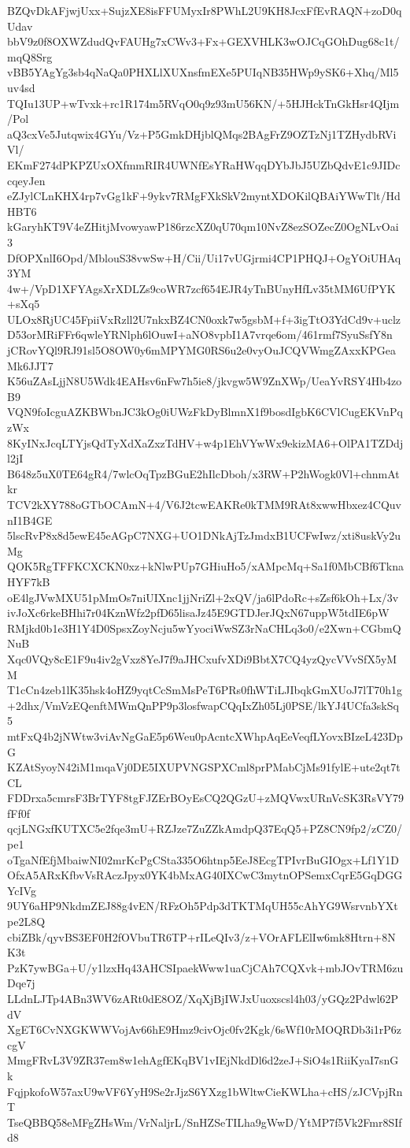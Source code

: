 BZQvDkAFjwjUxx+SujzXE8isFFUMyxIr8PWhL2U9KH8JcxFfEvRAQN+zoD0qUdav
bbV9z0f8OXWZdudQvFAUHg7xCWv3+Fx+GEXVHLK3wOJCqGOhDug68c1t/mqQ8Srg
vBB5YAgYg3sb4qNaQa0PHXLlXUXnsfmEXe5PUIqNB35HWp9ySK6+Xhq/Ml5uv4sd
TQIu13UP+wTvxk+rc1R174m5RVqO0q9z93mU56KN/+5HJHckTnGkHsr4QIjm/Pol
aQ3cxVe5Jutqwix4GYu/Vz+P5GmkDHjblQMqs2BAgFrZ9OZTzNj1TZHydbRViVl/
EKmF274dPKPZUxOXfmmRIR4UWNfEsYRaHWqqDYbJbJ5UZbQdvE1c9JIDccqeyJen
eZJylCLnKHX4rp7vGg1kF+9ykv7RMgFXkSkV2myntXDOKilQBAiYWwTlt/HdHBT6
kGaryhKT9V4eZHitjMvowyawP186rzcXZ0qU70qm10NvZ8ezSOZecZ0OgNLvOai3
DfOPXnlI6Opd/MblouS38vwSw+H/Cii/Ui17vUGjrmi4CP1PHQJ+OgYOiUHAq3YM
4w+/VpD1XFYAgsXrXDLZs9coWR7zcf654EJR4yTnBUnyHfLv35tMM6UfPYK+sXq5
ULOx8RjUC45FpiiVxRzll2U7nkxBZ4CN0oxk7w5gsbM+f+3igTtO3YdCd9v+uclz
D53orMRiFFr6qwleYRNlph6lOuwI+aNO8vpbI1A7vrqe6om/461rmf7SyuSsfY8n
jCRovYQl9RJ91sl5O8OW0y6mMPYMG0RS6u2e0vyOuJCQVWmgZAxxKPGeaMk6JJT7
K56uZAsLjjN8U5Wdk4EAHsv6nFw7h5ie8/jkvgw5W9ZnXWp/UeaYvRSY4Hb4zoB9
VQN9foIcguAZKBWbnJC3kOg0iUWzFkDyBlmnX1f9bosdIgbK6CVlCugEKVnPqzWx
8KyINxJcqLTYjsQdTyXdXaZxzTdHV+w4p1EhVYwWx9ekizMA6+OlPA1TZDdjl2jI
B648z5uX0TE64gR4/7wlcOqTpzBGuE2hIlcDboh/x3RW+P2hWogk0Vl+chnmAtkr
TCV2kXY788oGTbOCAmN+4/V6J2tcwEAKRe0kTMM9RAt8xwwHbxez4CQuvnI1B4GE
5lscRvP8x8d5ewE45eAGpC7NXG+UO1DNkAjTzJmdxB1UCFwIwz/xti8uskVy2uMg
QOK5RgTFFKCXCKN0xz+kNlwPUp7GHiuHo5/xAMpcMq+Sa1f0MbCBf6TknaHYF7kB
oE4lgJVwMXU51pMmOs7niUIXnc1jjNriZl+2xQV/ja6lPdoRc+sZsf6kOh+Lx/3v
ivJoXc6rkeBHhi7r04KznWfz2pfD65lisaJz45E9GTDJerJQxN67uppW5tdIE6pW
RMjkd0b1e3H1Y4D0SpsxZoyNcju5wYyociWwSZ3rNaCHLq3o0/e2Xwn+CGbmQNuB
Xqc0VQy8cE1F9u4iv2gVxz8YeJ7f9aJHCxufvXDi9BbtX7CQ4yzQycVVvSfX5yMM
T1cCn4zeb1lK35hsk4oHZ9yqtCcSmMsPeT6PRs0fhWTiLJIbqkGmXUoJ7lT70h1g
+2dhx/VmVzEQenftMWmQnPP9p3losfwapCQqIxZh05Lj0PSE/lkYJ4UCfa3skSq5
mtFxQ4b2jNWtw3viAvNgGaE5p6Weu0pAcntcXWhpAqEeVeqfLYovxBIzeL423DpG
KZAtSyoyN42iM1mqaVj0DE5IXUPVNGSPXCml8prPMabCjMs91fylE+ute2qt7tCL
FDDrxa5cmrsF3BrTYF8tgFJZErBOyEsCQ2QGzU+zMQVwxURnVcSK3RsVY79fFf0f
qcjLNGxfKUTXC5e2fqe3mU+RZJze7ZuZZkAmdpQ37EqQ5+PZ8CN9fp2/zCZ0/pe1
oTgaNfEfjMbaiwNI02mrKcPgCSta335O6htnp5EeJ8EcgTPIvrBuGIOgx+Lf1Y1D
OfxA5ARxKfbvVsRAczJpyx0YK4bMxAG40IXCwC3mytnOPSemxCqrE5GqDGGYcIVg
9UY6aHP9NkdmZEJ88g4vEN/RFzOh5Pdp3dTKTMqUH55cAhYG9WsrvnbYXtpe2L8Q
cbiZBk/qyvBS3EF0H2fOVbuTR6TP+rILeQIv3/z+VOrAFLElIw6mk8Htrn+8NK3t
PzK7ywBGa+U/y1lzxHq43AHCSIpaekWww1uaCjCAh7CQXvk+mbJOvTRM6zuDqe7j
LLdnLJTp4ABn3WV6zARt0dE8OZ/XqXjBjIWJxUuoxscsl4h03/yGQz2Pdwl62PdV
XgET6CvNXGKWWVojAv66hE9Hmz9civOjc0fv2Kgk/6sWf10rMOQRDb3i1rP6zcgV
MmgFRvL3V9ZR37em8w1ehAgfEKqBV1vIEjNkdDl6d2zeJ+SiO4s1RiiKyaI7snGk
FqjpkofoW57axU9wVF6YyH9Se2rJjzS6YXzg1bWltwCieKWLha+cHS/zJCVpjRnT
TseQBBQ58eMFgZHsWm/VrNaljrL/SnHZSeTILha9gWwD/YtMP7f5Vk2Fmr8SIfd8
